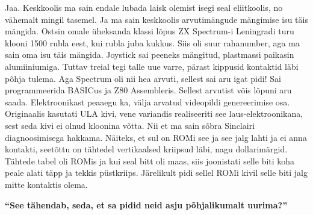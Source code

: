 Jaa. Keskkoolis ma sain endale lubada laisk olemist isegi seal eliitkoolis, no vähemalt mingil tasemel. Ja ma sain keskkoolis arvutimängude mängimise isu täis mängida. Ostsin omale üheksanda klassi lõpus ZX Spectrum-i Leningradi turu klooni 1500 rubla eest, kui rubla juba kukkus. Siis oli suur rahanumber, aga ma sain oma isu täis mängida. Joystick sai peeneks mängitud, plastmassi paikasin alumiiniumiga. Tuttav treial tegi talle uue varre, pärast kippusid kontaktid läbi põhja tulema. Aga Spectrum oli nii hea arvuti, sellest sai aru igat pidi! Sai programmeerida BASICus ja Z80 Assembleris. Sellest arvutist võis lõpuni aru saada. Elektroonikast peaaegu ka, välja arvatud videopildi genereerimise osa. Originaalis kasutati ULA kivi, vene variandis realiseeriti see laus-elektroonikana, sest seda kivi ei olnud kloonina võtta. Nii et ma sain sõbra Sinclairi diagnoosimisega hakkama. Näiteks, et sul on ROMi see ja see jalg lahti ja ei anna kontakti, seetõttu on tähtedel vertikaalsed kriipsud läbi, nagu dollarimärgid. Tähtede tabel oli ROMis ja kui seal bitt oli maas, siis joonistati selle biti koha peale alati täpp ja tekkis püstkriips. Järelikult pidi sellel ROMi kivil selle biti jalg mitte kontaktis olema.

\textbf{\enquote{See tähendab, seda, et sa pidid neid asju põhjalikumalt uurima?}}


